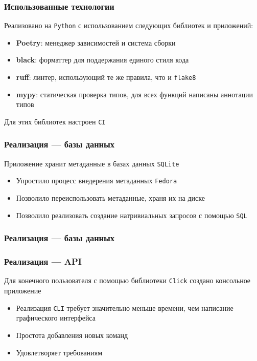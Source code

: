 \documentclass{beamer}
\begin{document}
\begin{frame}[fragile]
	\frametitle{Использованные технологии}
	Реализовано на \texttt{Python} с использованием следующих библиотек и приложений:
	\begin{itemize}
		\item \textbf{Poetry}: менеджер зависимостей и система сборки
		\item \textbf{black}: форматтер для поддержания единого стиля кода
		\item \textbf{ruff}: линтер, использующий те же правила, что и \texttt{flake8}
		\item \textbf{mypy}: статическая проверка типов, для всех функций написаны аннотации типов
	\end{itemize}

	Для этих библиотек настроен \texttt{CI}
\end{frame}

\begin{frame}[fragile]
	\frametitle{Реализация --- базы данных}
	Приложение хранит метаданные в базах данных \texttt{SQLite}
	\begin{itemize}
		\item Упростило процесс внедерения метаданных \texttt{Fedora}
		\item Позволило переиспользовать метаданные, храня их на диске
		\item Позволило реализовать создание натривиальных запросов с помощью \texttt{SQL}
	\end{itemize}
\end{frame}

\begin{frame}[fragile]
	\frametitle{Реализация --- базы данных}
	\begin{figure}
		\centering
		
	\end{figure}
\end{frame}

\begin{frame}[fragile]
	\frametitle{Реализация --- API}
	Для конечного пользователя с помощью библиотеки \texttt{Click} создано консольное приложение
	\begin{itemize}
		\item Реализация \texttt{CLI} требует значительно меньше времени, чем написание графического интерфейса
		\item Простота добавления новых команд
		\item Удовлетворяет требованиям
	\end{itemize}

	\begin{figure}[ht]
		\centering
		
		\label{cli}
	\end{figure}
\end{frame}
\end{document}

